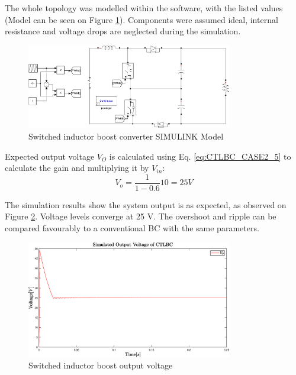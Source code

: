 The whole topology was modelled within the software, with the listed values (Model can be seen on Figure \ref{fig:Model_CTLBC}). Components were assumed ideal, internal resistance and voltage drops are neglected during the simulation. 

\begin{figure} [H]
   \centering
   \includegraphics[width=0.8\textwidth]{figures/dConventionalThreeLevelBC/Model_CTLBC.pdf}
    \caption{Switched inductor boost converter SIMULINK Model}
	\label{fig:Model_CTLBC}
\end{figure}

Expected output voltage $V_O$ is calculated using Eq. \ref{eq:CTLBC_CASE2_5} to calculate the gain and multiplying it by $V_{in}$: 
\begin{equation}
	{V_o}= \frac{1}{1-0.6}10=25V
	\label{eq:Simulation_CTLBC}
\end{equation}

The simulation results show the system output is as expected, as observed on Figure \ref {fig:Simulation_CTLBC}. Voltage levels converge at 25 V. The overshoot and ripple can be compared favourably to a conventional BC with the same parameters. 


\begin{figure} [H]
   \centering
   \includegraphics[width=0.8\textwidth]{figures/dConventionalThreeLevelBC/Simulation_CTLBC.eps}
    \caption{Switched inductor boost output voltage}
	\label{fig:Simulation_CTLBC}
\end{figure}